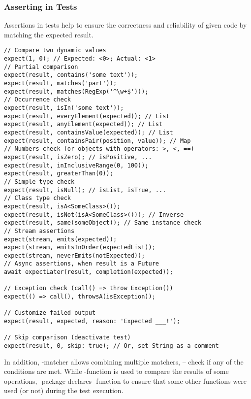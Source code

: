 \newpage
\subsubsection{Asserting in Tests}

Assertions in tests help to ensure the correctness and reliability of given code by matching the expected result.

\begin{lstlisting}
// Compare two dynamic values
expect(1, 0); // Expected: <0>; Actual: <1>
// Partial comparison
expect(result, contains('some text'));
expect(result, matches('part'));
expect(result, matches(RegExp('^\w+$')));
// Occurrence check
expect(result, isIn('some text'));
expect(result, everyElement(expected)); // List
expect(result, anyElement(expected)); // List
expect(result, containsValue(expected)); // List
expect(result, containsPair(position, value)); // Map
// Numbers check (or objects with operators: >, <, ==)
expect(result, isZero); // isPositive, ...
expect(result, inInclusiveRange(0, 100));
expect(result, greaterThan(0));
// Simple type check
expect(result, isNull); // isList, isTrue, ...
// Class type check
expect(result, isA<SomeClass>());
expect(result, isNot(isA<SomeClass>())); // Inverse
expect(result, same(someObject)); // Same instance check
// Stream assertions
expect(stream, emits(expected));
expect(stream, emitsInOrder(expectedList));
expect(stream, neverEmits(notExpected));
// Async assertions, when result is a Future
await expectLater(result, completion(expected));

// Exception check (call() => throw Exception())
expect(() => call(), throwsA(isException));

// Customize failed output
expect(result, expected, reason: 'Expected ___!');

// Skip comparison (deactivate test)
expect(result, 0, skip: true); // Or, set String as a comment
\end{lstlisting}

\noindent In addition, -matcher allows combining multiple matchers,  -- check if any of the conditions 
are met. While -function is used to compare the results of some operations, -package declares 
-function to ensure that some other functions were used (or not) during the test execution.
